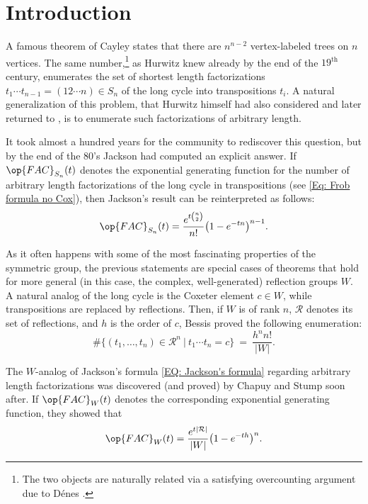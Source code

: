 \section{Introduction}

A famous theorem of Cayley states that there are $n^{n-2}$ vertex-labeled trees on $n$ vertices. The same number,\footnote{The two objects are naturally related via a satisfying overcounting argument due to D{\'e}nes \cite{denes-first-paper}.} as Hurwitz knew \cite{hurwitz-1891-paper} already by the end of the $19^{\text{th}}$ century, enumerates the set of shortest length factorizations $t_1\cdots t_{n-1}=(12\cdots n)\in S_n$ of the long cycle into transpositions $t_i$. A natural generalization of this problem, that Hurwitz himself had also considered and later returned to \cite{hurwitz-1901-paper}, is to enumerate such factorizations of arbitrary length.

It took almost a hundred years for the community to rediscover this question, but by the end of the 80's Jackson \cite[Corol.~4.2]{jackson-first-proof-of-arb-length} had computed an explicit answer. If $\op{FAC}_{S_n}(t)$ denotes the exponential generating function for the number of arbitrary length factorizations of the long cycle in transpositions (see \eqref{Eq: Frob formula no Cox}), then Jackson's result can be reinterpreted as follows: \begin{equation}
\op{FAC}_{S_n}(t)=\dfrac{e^{t\binom{n}{2}}}{n!}\big( 1-e^{-tn}\big)^{n-1}.\label{EQ: Jackson's formula}
\end{equation}

As it often happens with some of the most fascinating properties of the symmetric group, the previous statements are special cases of theorems that hold for more general (in this case, the complex, well-generated) reflection groups $W$. A natural analog of the long cycle is the Coxeter element $c\in W$, while transpositions are replaced by reflections. Then, if $W$ is of rank $n$, $\mathcal{R}$ denotes its set of reflections, and $h$ is the order of $c$, Bessis \cite[Prop.~7.6]{bes-kpi1} proved the following enumeration: \begin{equation}
\#\Big\{ (t_1,\ldots,t_n)\in \mathcal{R}^n\ |\ t_1\cdots t_n=c\Big\}\ =\ \dfrac{h^nn!}{|W|}.\label{EQ: Hurwitz number for W}
\end{equation}

The $W$-analog of Jackson's formula \eqref{EQ: Jackson's formula} regarding arbitrary length factorizations was discovered (and proved) by Chapuy and Stump \cite{chapuy-stump} soon after. If $\op{FAC}_W(t)$ denotes the corresponding exponential generating function, they showed that \begin{equation}
\op{FAC}_W(t)=\dfrac{e^{t|\mathcal{R}|}}{|W|}\big( 1-e^{-th}\big)^n.\label{EQ: Chapuy-Stump formula}
\end{equation}

